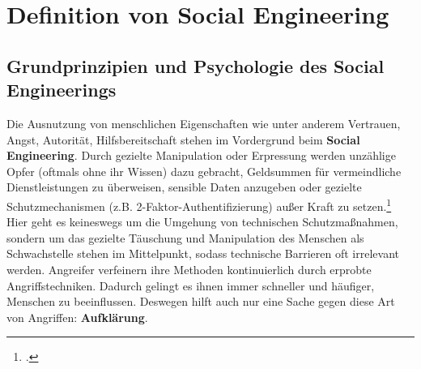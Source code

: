 \documentclass[12pt, a4paper, oneside]{scrartcl}
\begin{document}
\section{Definition von Social Engineering}

\subsection{Grundprinzipien und Psychologie des Social Engineerings}
Die Ausnutzung von menschlichen Eigenschaften wie unter anderem Vertrauen, Angst, Autorität, Hilfsbereitschaft 
stehen im Vordergrund beim \textbf{Social Engineering}. Durch gezielte Manipulation
oder Erpressung werden unzählige Opfer (oftmals ohne ihr Wissen) dazu gebracht, Geldsummen
für vermeindliche Dienstleistungen zu überweisen, sensible Daten anzugeben oder gezielte Schutzmechanismen
(z.B. 2-Faktor-Authentifizierung) außer Kraft zu setzen.\footcite{BSISocialEngineering}\\
Hier geht es keineswegs um die Umgehung von technischen Schutzmaßnahmen, sondern um das gezielte
Täuschung und Manipulation des Menschen als Schwachstelle stehen im Mittelpunkt, sodass technische Barrieren 
oft irrelevant werden. Angreifer verfeinern ihre Methoden kontinuierlich durch erprobte Angriffstechniken. 
Dadurch gelingt es ihnen immer schneller und häufiger, Menschen zu beeinflussen.
Deswegen hilft auch nur eine Sache gegen diese Art von Angriffen: \textbf{Aufklärung}.\\

\end{document}

